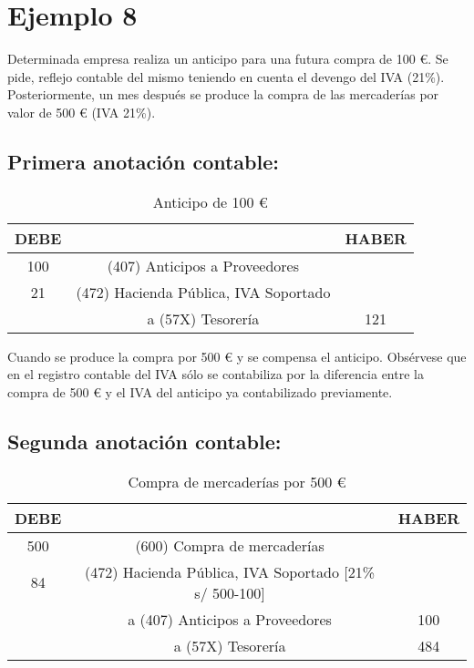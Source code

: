 \documentclass{article}
\begin{document}
\section*{Ejemplo 8}
Determinada empresa realiza un anticipo para una futura compra de 100 €. Se pide, reflejo contable del mismo teniendo en cuenta el devengo del IVA (21\%). Posteriormente, un mes después se produce la compra de las mercaderías por valor de 500 € (IVA 21\%).

\subsection*{Primera anotación contable:}
\begin{table}[H]
\centering
\begin{tabular}{|c|c|c|}
\hline
\textbf{DEBE} & & \textbf{HABER} \\
\hline
100 & (407) Anticipos a Proveedores & \\
\hline
21 & (472) Hacienda Pública, IVA Soportado & \\ 
\hline
& a (57X) Tesorería & 121 \\
\hline
\end{tabular}
\caption{Anticipo de 100 €}
\end{table}

Cuando se produce la compra por 500 € y se compensa el anticipo. Obsérvese que en el registro contable del IVA sólo se contabiliza por la diferencia entre la compra de 500 € y el IVA del anticipo ya contabilizado previamente.



\subsection*{Segunda anotación contable:}
\begin{table}[H]
\centering
\begin{tabular}{|c|c|c|}
\hline
\textbf{DEBE} & & \textbf{HABER} \\
\hline
500 & (600) Compra de mercaderías & \\
\hline
84 & (472) Hacienda Pública, IVA Soportado [21\% s/ 500-100] & \\ 
\hline
& a (407) Anticipos a Proveedores & 100 \\
\hline
& a (57X) Tesorería & 484 \\
\hline
\end{tabular}
\caption{Compra de mercaderías por 500 €}
\end{table}
\end{document}
